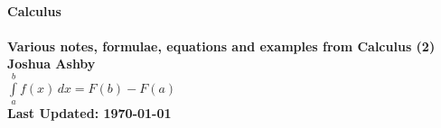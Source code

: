 \begin{titlepage}
\begin{center}
\\[2cm]
\Huge\bfseries{\color{BrickRed}Calculus}\\[0.5cm]
\hline\\[1.5cm]
\normalsize{\color{Gray}Various notes, formulae, equations and
examples from Calculus (2)}\\[1cm]
\large\bfseries{\color{BrickRed}Joshua Ashby}\\[3cm]
\Huge{$\int\limits_{a}^{b} f(x)\,dx=F(b)-F(a)$}\\
\vfill
\scriptsize Last Updated: \today
\end{center}
\end{titlepage}

